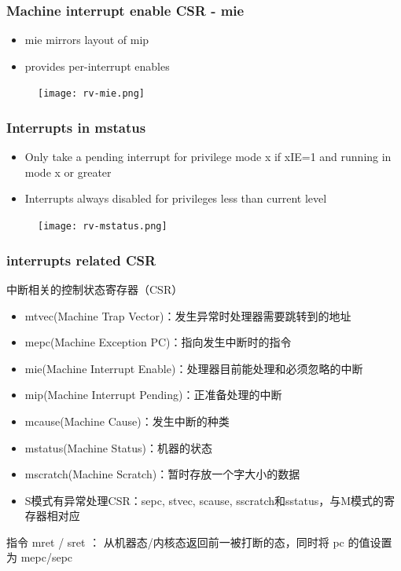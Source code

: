 \begin{frame}[fragile]
    \frametitle{Machine interrupt enable CSR - mie}
    \begin{itemize}
        \item  mie mirrors layout of mip
        \item  provides per-interrupt enables	  
    \end{itemize}
    \begin{figure}
        \texttt{[image: rv-mie.png]}
    \end{figure}
\end{frame}
\begin{frame}[fragile]
    \frametitle{Interrupts in mstatus}
    \begin{itemize}
        \item  Only take a pending interrupt for privilege mode x if xIE=1 and running in mode x or greater
        \item  Interrupts always disabled for privileges less than current level  
    \end{itemize}
    \begin{figure}
        \texttt{[image: rv-mstatus.png]}
    \end{figure}
\end{frame}

\begin{frame}[fragile]
    \frametitle{interrupts related CSR}
    中断相关的控制状态寄存器（CSR）
    \begin{itemize}
        \item mtvec(Machine Trap Vector)：发生异常时处理器需要跳转到的地址
        \item mepc(Machine Exception PC)：指向发生中断时的指令
        \item mie(Machine Interrupt Enable)：处理器目前能处理和必须忽略的中断
        \item mip(Machine Interrupt Pending)：正准备处理的中断
        \item mcause(Machine Cause)：发生中断的种类
        \item mstatus(Machine Status)：机器的状态
        \item mscratch(Machine Scratch)：暂时存放一个字大小的数据
        \item S模式有异常处理CSR：sepc, stvec, scause, sscratch和sstatus，与M模式的寄存器相对应
    \end{itemize}
    指令 mret / sret ： 从机器态/内核态返回前一被打断的态，同时将 pc 的值设置为 mepc/sepc
\end{frame}

